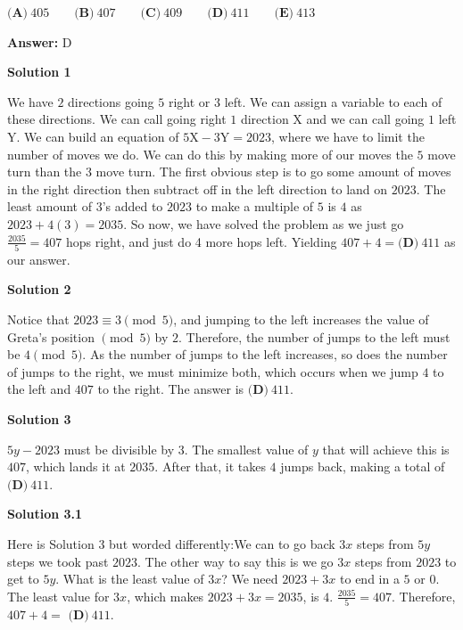 \begin{enumerate}
 $\textbf{(A)}\ 405 \qquad \textbf{(B)}\ 407 \qquad \textbf{(C)}\ 409 \qquad \textbf{(D)}\ 411 \qquad \textbf{(E)}\ 413$

 \textbf{Answer: }D



\textbf{Solution 1}

We have $2$ directions going $5$ right or $3$ left. We can assign a variable to each of these directions. We can call going right $1$ direction $\text{X}$ and we can call going $1$ left $\text{Y}$. We can build an equation of $5\text{X}-3\text{Y}=2023$, where we have to limit the number of moves we do. We can do this by making more of our moves the $5$ move turn than the $3$ move turn. The first obvious step is to go some amount of moves in the right direction then subtract off in the left direction to land on $2023$. The least amount of $3$’s added to $2023$ to make a multiple of $5$ is $4$ as $2023 + 4(3) = 2035$. So now, we have solved the problem as we just go $\frac{2035}{5} = 407$ hops right, and just do 4 more hops left. Yielding $407 + 4 = \boxed{\textbf{(D)}\ 411}$ as our answer.

 



\textbf{Solution 2}

Notice that $2023 \equiv 3\pmod{5}$, and jumping to the left increases the value of Greta's position $\pmod{5}$ by $2$. Therefore, the number of jumps to the left must be $4 \pmod{5}$. As the number of jumps to the left increases, so does the number of jumps to the right, we must minimize both, which occurs when we jump $4$ to the left and $407$ to the right. The answer is $\boxed{\textbf{(D)}\ 411}$.

 



\textbf{Solution 3}

$5y - 2023$ must be divisible by 3. The smallest value of $y$ that will achieve this is $407$, which lands it at $2035$. After that, it takes $4$ jumps back, making a total of $\boxed{\textbf{(D)}\ 411}$.

 



\textbf{Solution 3.1}

Here is Solution 3 but worded differently:We can to go back $3x$ steps from $5y$ steps we took past $2023$. The other way to say this is we go $3x$ steps from $2023$ to get to $5y$. What is the least value of $3x$? We need $2023+3x$ to end in a $5$ or $0$. The least value for $3x$, which makes $2023+3x=2035$, is $4$. $\frac{2035}{5}=407$. Therefore, $407+4=$ $\boxed{\textbf{(D)}\ 411}$.


\end{enumerate}
